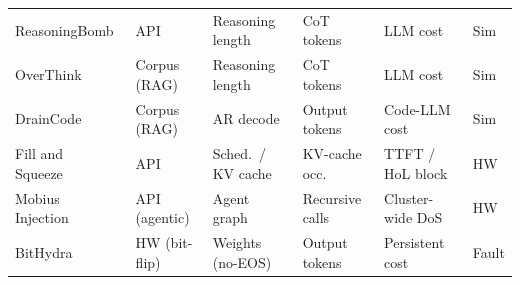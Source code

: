\documentclass[acmsmall,screen,review,nonacm]{acmart}
\begin{document}
\begin{table}[htbp]
\begin{tabularx}{\textwidth}{@{}l l L{2.4cm} L{2.6cm} L{2.6cm} l@{}}
    ReasoningBomb~\cite{liu2026reasoningbomb} & API & Reasoning length & CoT tokens & LLM cost & Sim \\
    OverThink~\cite{kumar2025overthink} & Corpus (RAG) & Reasoning length & CoT tokens & LLM cost & Sim \\
    DrainCode~\cite{wang2025draincode} & Corpus (RAG) & AR decode & Output tokens & Code-LLM cost & Sim \\
    Fill and Squeeze~\cite{wang2026fillsqueeze} & API & Sched.\ / KV cache & KV-cache occ.\ & TTFT / HoL block & HW \\
    Mobius Injection~\cite{liang2026mobius} & API (agentic) & Agent graph & Recursive calls & Cluster-wide DoS & HW \\
    BitHydra~\cite{yan2025bithydra} & HW (bit-flip) & Weights (no-EOS) & Output tokens & Persistent cost & Fault \\
    \bottomrule
  \end{tabularx}
\end{table}
\end{document}
